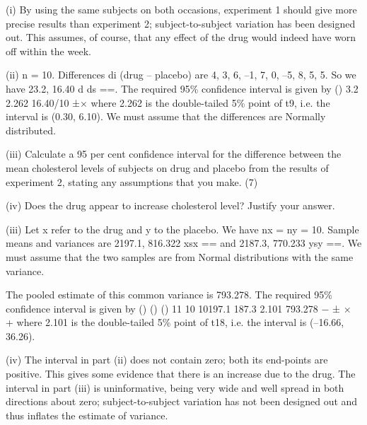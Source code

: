 \documentclass[a4paper,12pt]{article}
\begin{document}
 
(i) By using the same subjects on both occasions, experiment 1 should give more precise results than experiment 2;  subject-to-subject variation has been designed out.  This assumes, of course, that any effect of the drug would indeed have worn off within the week. 
 
 
(ii) n = 10.  Differences di (drug – placebo) are 4, 3, 6, –1, 7, 0, –5, 8, 5, 5.  So we have 23.2, 16.40 d ds ==.  The required 95\% confidence interval is given by () 3.2 2.262 16.40/10 ±× where 2.262 is the double-tailed 5\% point of t9, i.e. the interval is (0.30, 6.10). We must assume that the differences are Normally distributed. 
 

\newpage
\begin{framed}
(iii) Calculate a 95 per cent confidence interval for the difference between the mean cholesterol levels of subjects on drug and placebo from the results of experiment 2, stating any assumptions that you make. (7) 
 
(iv) Does the drug appear to increase cholesterol level?  Justify your answer. 

\end{framed} 
(iii) Let x refer to the drug and y to the placebo.  We have nx = ny = 10.  Sample means and variances are 2197.1, 816.322 xsx == and 2187.3, 770.233 ysy ==.  We must assume that the two samples are from Normal distributions with the same variance. 
 
The pooled estimate of this common variance is 793.278.  The required 95\% confidence interval is given by () () () 11 10 10197.1 187.3 2.101 793.278 − ± × + where 2.101 is the double-tailed 5\% point of t18, i.e. the interval is (–16.66, 36.26). 
 
 
(iv) The interval in part (ii) does not contain zero;  both its end-points are positive.  This gives some evidence that there is an increase due to the drug.  The interval in part (iii) is uninformative, being very wide and well spread in both directions about zero;  subject-to-subject variation has not been designed out and thus inflates the estimate of variance. 
 
\end{document}
